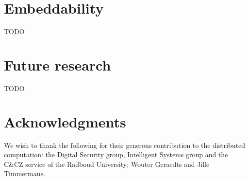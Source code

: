 \documentclass[a4paper]{article}
\newcounter{main}
\theoremstyle{definition}
\theoremstyle{remark}
\begin{document}
\section{Embeddability}
TODO

\section{Future research}
TODO

\section{Acknowledgments}
We wish to thank the following for their generous contribution to the
distributed computation:
    the Digital Security group, Intelligent Systems group
    and the C\&CZ service of the Radboud University;
    Wouter Geraedts and
    Jille Timmermans.

{}

\end{document}
